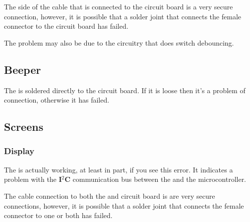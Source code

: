 \par\medskip

The side of the cable that is connected to the circuit board is a very secure
connection, however, it is possible that a solder joint that connects the
female connector to the circuit board has failed.

\par\medskip

The problem may also be due to the circuitry that does switch debouncing.

\subsection{Beeper}

 

\par\bigskip

The  is soldered directly to the circuit board.  If it is loose then
it's a problem of connection, otherwise it has failed.

\subsection{Screens}

\subsubsection{Display}

 

\par\bigskip

The  is actually working, at least in part, if you see this error.
It indicates a problem with the \textbf{I$^2$C} communication bus between the
 and the microcontroller.

\par\medskip

The cable connection to both the  and circuit board is are very
secure connections, however, it is possible that a solder joint that connects
the female connector to one or both has failed.


